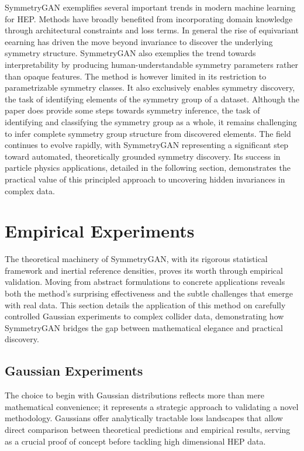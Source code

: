         SymmetryGAN exemplifies several important trends in modern machine learning for HEP.
        Methods have broadly benefited from incorporating domain knowledge through architectural constraints and loss terms.
        In general the rise of equivariant eearning has driven the move beyond invariance to discover the underlying symmetry structure.
        SymmetryGAN also exemplies the trend towards interpretability by producing human-understandable symmetry parameters rather than opaque features.
        The method is however limited in its restriction to parametrizable symmetry classes.
        It also exclusively enables symmetry discovery, the task of identifying elements of the symmetry group of a dataset.
        Although the paper does provide some steps towards symmetry inference, the task of identifying and classifying the symmetry group as a whole, it remains challenging to infer complete symmetry group structure from discovered elements.
        The field continues to evolve rapidly, with SymmetryGAN representing a significant step toward automated, theoretically grounded symmetry discovery.
        Its success in particle physics applications, detailed in the following section, demonstrates the practical value of this principled approach to uncovering hidden invariances in complex data.

\section{Empirical Experiments}
        The theoretical machinery of SymmetryGAN, with its rigorous statistical framework and inertial reference densities, proves its worth through empirical validation.
        Moving from abstract formulations to concrete applications reveals both the method's surprising effectiveness and the subtle challenges that emerge with real data.
        This section details the application of this method on carefully controlled Gaussian experiments to complex collider data, demonstrating how SymmetryGAN bridges the gap between mathematical elegance and practical discovery.

        \subsection{Gaussian Experiments}
            The choice to begin with Gaussian distributions reflects more than mere mathematical convenience; it represents a strategic approach to validating a novel methodology.
            Gaussians offer analytically tractable loss landscapes that allow direct comparison between theoretical predictions and empirical results, serving as a crucial proof of concept before tackling high dimensional HEP data.

